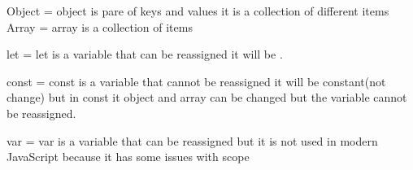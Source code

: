 Object = object is pare of keys and values it is a collection of different items
Array = array is a collection of items



let = let is a variable that can be reassigned it will be .



const = const is a variable that cannot be reassigned it will be constant(not change)
but in const it object and array can be changed but the variable cannot be reassigned.



var = var is a variable that can be reassigned but it is not used in modern JavaScript because it has some issues with scope